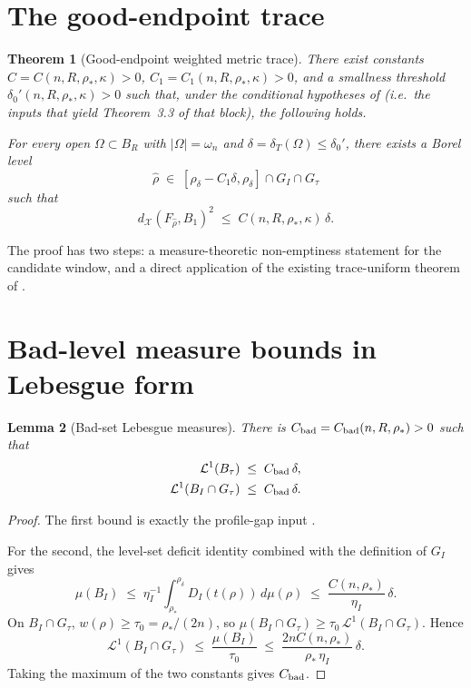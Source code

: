 \documentclass[11pt]{article}
\newtheorem{theorem}{Theorem}[section]
\newtheorem{lemma}[theorem]{Lemma}
\theoremstyle{definition}
\newcommand{\Om}{\Omega}
\newcommand{\rstar}{\rho_{*}}
\newcommand{\rdel}{\rho_\delta}
\newcommand{\rhad}{\widehat\rho}
\newcommand{\X}{\mathcal X}
\begin{document}
\section{The good-endpoint trace}\label{sec:statement}

\begin{theorem}[Good-endpoint weighted metric trace]\label{thm:good-end}
There exist constants $C=C(n,R,\rstar,\kappa)>0$,
$C_1=C_1(n,R,\rstar,\kappa)>0$, and a smallness threshold
$\delta_0'(n,R,\rstar,\kappa)>0$ such that, under the conditional
hypotheses of \cite[Hyp.~3.5--3.7]{WeightedMetricTrace} (i.e.\ the
inputs that yield Theorem~3.3 of that block), the following holds.

For every open $\Om\subset B_R$ with $|\Om|=\omega_n$ and
$\delta=\delta_T(\Om)\le\delta_0'$, there exists a Borel level
\begin{equation}\label{eq:rhat-range}
   \rhad\;\in\;[\rdel-C_1\delta,\rdel]\cap G_I\cap G_\tau
\end{equation}
such that
\begin{equation}\label{eq:rhat-trace}
   d_\X(F_{\rhad},B_1)^{2}\;\le\;C(n,R,\rstar,\kappa)\,\delta.
\end{equation}
\end{theorem}

The proof has two steps: a measure-theoretic non-emptiness statement
for the candidate window, and a direct application of the existing
trace-uniform theorem of \cite{WeightedMetricTrace}.

\section{Bad-level measure bounds in Lebesgue form}\label{sec:bad-measure}

\begin{lemma}[Bad-set Lebesgue measures]\label{lem:bad-leb}
There is $C_{\rm bad}=C_{\rm bad}(n,R,\rstar)>0$ such that
\begin{align}
   \mathcal L^1(B_\tau)
      &\;\le\; C_{\rm bad}\,\delta,
      \label{eq:Btau-leb}\\
   \mathcal L^1(B_I\cap G_\tau)
      &\;\le\; C_{\rm bad}\,\delta.
      \label{eq:BI-Gtau-leb}
\end{align}
\end{lemma}

\begin{proof}
The first bound is exactly the profile-gap input
\cite[Hyp.~3.7, eq.\ (profile-gap)]{WeightedMetricTrace}.

For the second, the level-set deficit identity
\cite[(DH-DI-int)]{WeightedMetricTrace} combined with the definition of
$G_I$ gives
\[
   \mu(B_I)\;\le\;\eta_I^{-1}
      \int_{\rstar}^{\rdel}D_I(t(\rho))\,d\mu(\rho)
   \;\le\; \frac{C(n,\rstar)}{\eta_I}\,\delta.
\]
On $B_I\cap G_\tau$, $w(\rho)\ge\tau_0=\rstar/(2n)$, so
$\mu(B_I\cap G_\tau)\ge \tau_0\,\mathcal L^1(B_I\cap G_\tau)$.
Hence
\[
   \mathcal L^1(B_I\cap G_\tau)
   \;\le\;\frac{\mu(B_I)}{\tau_0}
   \;\le\;\frac{2nC(n,\rstar)}{\rstar\,\eta_I}\,\delta.
\]
Taking the maximum of the two constants gives $C_{\rm bad}$.
\end{proof}
\end{document}
